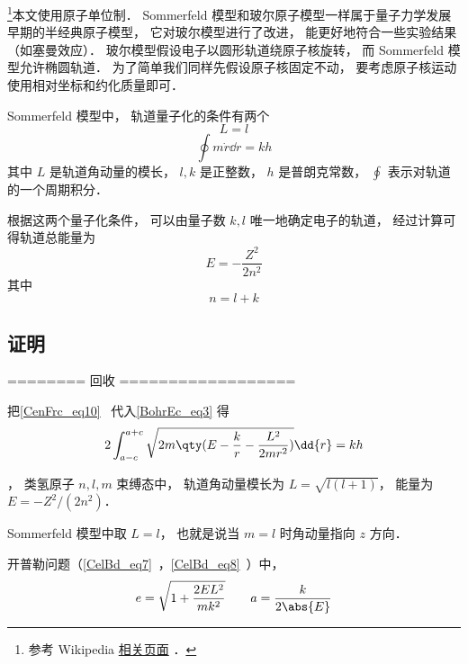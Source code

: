
\begin{issues}
\issueDraft
\end{issues}


\footnote{参考 Wikipedia \href{https://en.wikipedia.org/wiki/Old_quantum_theory}{相关页面}
．}本文使用原子单位制． Sommerfeld 模型和玻尔原子模型一样属于量子力学发展早期的半经典原子模型， 它对玻尔模型进行了改进， 能更好地符合一些实验结果（如塞曼效应）． 玻尔模型假设电子以圆形轨道绕原子核旋转， 而 Sommerfeld 模型允许椭圆轨道． 为了简单我们同样先假设原子核固定不动， 要考虑原子核运动使用相对坐标和约化质量即可．

Sommerfeld 模型中， 轨道量子化的条件有两个
\begin{equation}
L = l
\end{equation}
\begin{equation}\label{BohrEc_eq3}
\oint m\dot r \dd{r} = kh
\end{equation}
其中 $L$ 是轨道角动量的模长， $l, k$ 是正整数， $h$ 是普朗克常数， $\oint$ 表示对轨道的一个周期积分． 

根据这两个量子化条件， 可以由量子数 $k, l$ 唯一地确定电子的轨道， 经过计算可得轨道总能量为
\begin{equation}
E = -\frac{Z^2}{2n^2}
\end{equation}
其中
\begin{equation}\label{BohrEc_eq2}
n = l + k
\end{equation}

\subsection{证明}

======== 回收 ==================

把\autoref{CenFrc_eq10}~ 代入\autoref{BohrEc_eq3} 得
\begin{equation}\label{BohrEc_eq1}
2\int_{a-c}^{a+c} \sqrt{2m\qty(E - \frac{k}{r} - \frac{L^2}{2mr^2})} \dd{r} = kh
\end{equation}

， 类氢原子 $n,l,m$ 束缚态中， 轨道角动量模长为 $L = \sqrt{l(l+1)}$， 能量为 $E = -Z^2/(2n^2)$．

Sommerfeld 模型中取 $L = l$， 也就是说当 $m = l$ 时角动量指向 $z$ 方向．

开普勒问题（\autoref{CelBd_eq7}~，\autoref{CelBd_eq8}~）中，
\begin{equation}
e = \sqrt{1 + \frac{2EL^2}{mk^2}}
\qquad
a = \frac{k}{2\abs{E}}
\end{equation}

